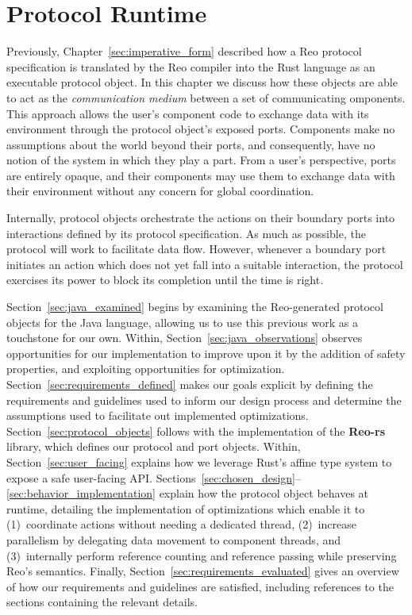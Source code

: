 \chapter{Protocol Runtime}
\label{sec:protocol_runtime}
Previously, Chapter~\ref{sec:imperative_form} described how a Reo protocol specification is translated by the Reo compiler into the Rust language as an executable protocol object. In this chapter we discuss how these objects are able to act as the \textit{communication medium} between a set of communicating omponents. This approach allows the user's component code to exchange data with its environment through the protocol object's exposed ports. Components make no assumptions about the world beyond their ports, and consequently, have no notion of the system in which they play a part. From a user's perspective, ports are entirely opaque, and their components may use them to exchange data with their environment without any concern for global coordination.

Internally, protocol objects orchestrate the actions on their boundary ports into interactions defined by its protocol specification. As much as possible, the protocol will work to facilitate data flow. However, whenever a boundary port initiates an action which does not yet fall into a suitable interaction, the protocol exercises its power to block its completion until the time is right. 

Section~\ref{sec:java_examined} begins by examining the Reo-generated protocol objects for the Java language, allowing us to use this previous work as a touchstone for our own. Within, Section~\ref{sec:java_observations} observes opportunities for our implementation to improve upon it by the addition of safety properties, and exploiting opportunities for optimization. Section~\ref{sec:requirements_defined} makes our goals explicit by defining the requirements and guidelines used to inform our design process and determine the assumptions used to facilitate out implemented optimizations.  Section~\ref{sec:protocol_objects} follows with the implementation of the \textbf{Reo-rs} library, which defines our protocol and port objects. Within, Section~\ref{sec:user_facing} explains how we leverage Rust's affine type system to expose a safe user-facing API. Sections~\ref{sec:chosen_design}--\ref{sec:behavior_implementation} explain how the protocol object behaves at runtime, detailing the implementation of optimizations which enable it to (1)~coordinate actions without needing a dedicated thread, (2)~increase parallelism by delegating data movement to component threads, and (3)~internally perform reference counting and reference passing while preserving Reo's semantics. Finally, Section~\ref{sec:requirements_evaluated} gives an overview of how our requirements and guidelines are satisfied, including references to the sections containing the relevant details.

